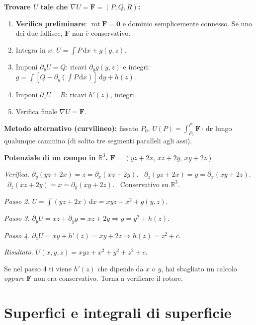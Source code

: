 \documentclass[11pt,a4paper,openany]{book}
\theoremstyle{plain}
\theoremstyle{definition}
\theoremstyle{remark}
\newcommand{\R}{\mathbb{R}}
\newcommand{\dd}{\,\mathrm{d}}
\newcommand{\Rot}{\operatorname{rot}}
\renewcommand{\vec}[1]{\mathbf{#1}}
\newcommand{\F}{\mathbf{F}}
\newcommand{\rr}{\mathbf{r}}
\begin{document}
\begin{ricetta}
\textbf{Trovare $U$ tale che $\nabla U=\F=(P,Q,R)$:}
\begin{enumerate}[leftmargin=*]
  \item \textbf{Verifica preliminare}: $\Rot\F=\vec{0}$ e dominio
        semplicemente connesso. Se uno dei due fallisce, $\F$ non \`e
        conservativo.
  \item Integra in $x$: $U=\int P\dd x+g(y,z)$.
  \item Imponi $\partial_y U=Q$: ricavi $\partial_y g(y,z)$ e integri:
        $g=\int [Q-\partial_y(\int P\dd x)]\dd y+h(z)$.
  \item Imponi $\partial_z U=R$: ricavi $h'(z)$, integri.
  \item Verifica finale $\nabla U=\F$.
\end{enumerate}
\textbf{Metodo alternativo (curvilineo):} fissato $P_0$, $U(P)=\int_{P_0}^{P}\F\cdot\dd\rr$
lungo qualunque cammino (di solito tre segmenti paralleli agli assi).
\end{ricetta}

\begin{esempio}
\textbf{Potenziale di un campo in $\R^3$.}
$\F=(yz+2x,\,xz+2y,\,xy+2z)$.

\emph{Verifica.} $\partial_y(yz+2x)=z=\partial_x(xz+2y)$. \checkmark\
$\partial_z(yz+2x)=y=\partial_x(xy+2z)$. \checkmark\
$\partial_z(xz+2y)=x=\partial_y(xy+2z)$. \checkmark\ Conservativo su $\R^3$.

\emph{Passo 2.} $U=\int(yz+2x)\dd x=xyz+x^2+g(y,z)$.

\emph{Passo 3.} $\partial_y U=xz+\partial_y g\stackrel{\!}{=}xz+2y\Rightarrow g=y^2+h(z)$.

\emph{Passo 4.} $\partial_z U=xy+h'(z)\stackrel{\!}{=}xy+2z\Rightarrow h(z)=z^2+c$.

\emph{Risultato.} $U(x,y,z)=xyz+x^2+y^2+z^2+c$.
\end{esempio}

\begin{trappola}
Se nel passo 4 ti viene $h'(z)$ che dipende da $x$ o $y$, hai sbagliato un
calcolo \emph{oppure} $\F$ non era conservativo. Torna a verificare il rotore.
\end{trappola}

\chapter{Superfici e integrali di superficie}
\end{document}
